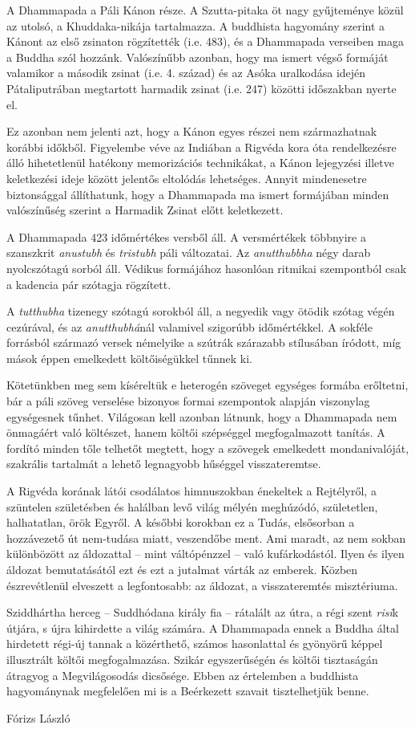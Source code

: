 
A Dhammapada a Páli Kánon része. A Szutta-pitaka öt nagy gyűjteménye közül az utolsó, a Khuddaka-nikája tartalmazza. A buddhista hagyomány szerint a Kánont az első zsinaton rögzítették (i.e. 483), és a Dhammapada verseiben maga a Buddha szól hozzánk. Valószínűbb azonban, hogy ma ismert végső formáját valamikor a második zsinat (i.e. 4. század) és az Asóka uralkodása idején Pátaliputrában megtartott harmadik zsinat (i.e. 247) közötti időszakban nyerte el.

Ez azonban nem jelenti azt, hogy a Kánon egyes részei nem származhatnak korábbi időkből. Figyelembe véve az Indiában a Rigvéda kora óta rendelkezésre álló hihetetlenül hatékony memorizációs technikákat, a Kánon lejegyzési illetve keletkezési ideje között jelentős eltolódás lehetséges. Annyit mindenesetre biztonsággal állíthatunk, hogy a Dhammapada ma ismert formájában minden valószínűség szerint a Harmadik Zsinat előtt keletkezett.

A Dhammapada 423 időmértékes versből áll. A versmértékek többnyire a szanszkrit \textit{anustubh} és \textit{tristubh} páli változatai. Az \textit{anutthubbha} négy darab nyolcszótagú sorból áll. Védikus formájához hasonlóan ritmikai szempontból csak a kadencia pár szótagja rögzített.

A \textit{tutthubha} tizenegy szótagú sorokból áll, a negyedik vagy ötödik szótag végén cezúrával, és az \textit{anutthubhá}nál valamivel szigorúbb időmértékkel. A sokféle forrásból származó versek némelyike a szútrák szárazabb stílusában íródott, míg mások éppen emelkedett költőiségükkel tűnnek ki.

Kötetünkben meg sem kíséreltük e heterogén szöveget egységes formába erőltetni, bár a páli szöveg verselése bizonyos formai szempontok alapján viszonylag egységesnek tűnhet. Világosan kell azonban látnunk, hogy a Dhammapada nem önmagáért való költészet, hanem költői szépséggel megfogalmazott tanítás. A fordító minden tőle telhetőt megtett, hogy a szövegek emelkedett mondanivalóját, szakrális tartalmát a lehető legnagyobb hűséggel visszateremtse.

A Rigvéda korának látói csodálatos himnuszokban énekeltek a Rejtélyről, a szüntelen születésben és halálban levő világ mélyén meghúzódó, születetlen, halhatatlan, örök Egyről. A későbbi korokban ez a Tudás, elsősorban a hozzávezető út nem-tudása miatt, veszendőbe ment. Ami maradt, az nem sokban különbözött az áldozattal -- mint váltópénzzel -- való kufárkodástól. Ilyen és ilyen áldozat bemutatásától ezt és ezt a jutalmat várták az emberek. Közben észrevétlenül elveszett a legfontosabb: az áldozat, a visszateremtés misztériuma.

Sziddhártha herceg -- Suddhódana király fia -- rátalált az útra, a régi szent \textit{risi}k útjára, s újra kihirdette a világ számára. A Dhammapada ennek a Buddha által hirdetett régi-új tannak a közérthető, számos hasonlattal és gyönyörű képpel illusztrált költői megfogalmazása. Szikár egyszerűségén és költői tisztaságán átragyog a Megvilágosodás dicsősége. Ebben az értelemben a buddhista hagyománynak megfelelően mi is a Beérkezett szavait tisztelhetjük benne.

\bigskip
{\raggedleft
Fórizs László
\par}
